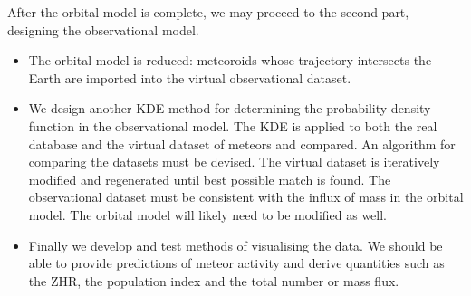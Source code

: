     After the orbital model is complete, we may proceed to the second part, designing the observational model.
    \begin{itemize}
        \item The orbital model is reduced: meteoroids whose trajectory intersects the Earth
            are imported into the virtual observational dataset.
        \item We design another KDE method for determining the probability density function
            in the observational model. The KDE is applied to both the real database and the virtual dataset
            of meteors and compared. An algorithm for comparing the datasets must be devised.
            The virtual dataset is iteratively modified and regenerated until best possible match is found.
            The observational dataset must be consistent with the influx of mass in the orbital model.
            The orbital model will likely need to be modified as well.
        \item Finally we develop and test methods of visualising the data. We should be able to provide
            predictions of meteor activity and derive quantities such as the ZHR, the population index
            and the total number or mass flux.
    \end{itemize}

